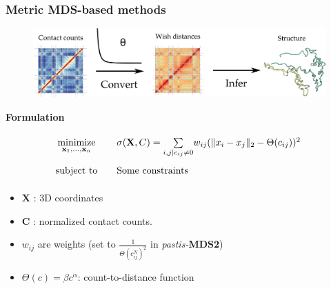 \documentclass[xcolor=dvipsnames]{beamer}
\begin{document}
\begin{frame}
\frametitle{Metric MDS-based methods}

\begin{figure}
\begin{center}
\includegraphics[width=0.9\linewidth]{figures/mds_idea.png}
\end{center}
\end{figure}
\vspace{1em}

\textbf{\color{Blue} Formulation}
\begin{equation*}
\renewcommand{\arraystretch}{2}
\begin{array}{ccll}
\underset{{\bf x}_1,\ldots,{\bf x}_n}{\text{minimize}} & &
\sigma(\mathbf{X},  C) = \underset{i, j | c_{ij} \neq 0}{\sum} w_{ij}(\|x_i - x_j\|_2 -
\Theta(c_{ij}))^2\,
\\
\text{subject to} & & \text{Some constraints} \\

\end{array}
\end{equation*}
\vspace{2em}

{\tiny
\begin{multicols}{2}
\begin{itemize}[label={$\bullet$}]
\item $\mathbf{X}$ : 3D coordinates
\item $\mathbf{C}$ : normalized contact counts.
\item $w_{ij}$ are weights (set to $\frac{1}{\Theta(c^N_{ij})^2}$ in
\textit{pastis-}\textbf{MDS2}) 
\item $\Theta(c) = \beta c^\alpha$: count-to-distance function
\end{itemize}
\end{multicols}
}
\end{frame}
\end{document}
